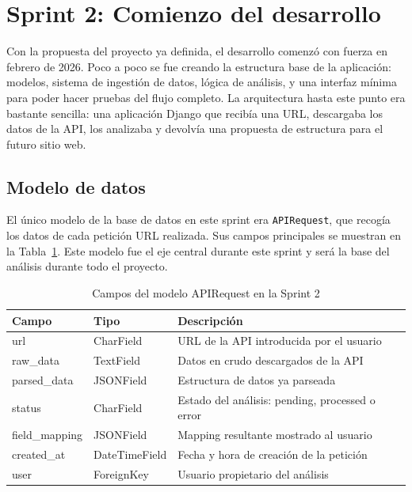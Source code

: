 \section{Sprint 2: Comienzo del desarrollo}
\label{sec:comienzo-desarrollo}

Con la propuesta del proyecto ya definida, el desarrollo comenzó con fuerza en febrero de 2026. Poco a poco se fue creando la estructura base de 
la aplicación: modelos, sistema de ingestión de datos, lógica de análisis, y una interfaz mínima para poder hacer
pruebas del flujo completo. La arquitectura hasta este punto era bastante sencilla: una aplicación Django que recibía una URL, descargaba los 
datos de la API, los analizaba y devolvía una propuesta de estructura para el futuro sitio web.

\subsection{Modelo de datos}
\label{subsec:modelo-datos}

El único modelo de la base de datos en este sprint era \texttt{APIRequest}, que recogía 
los datos de cada petición URL realizada. Sus campos principales se muestran en la 
Tabla~\ref{tab:modelo-apirequest}. Este modelo fue el eje central durante este sprint 
y será la base del análisis durante todo el proyecto.

\begin{table}[H]
    \centering
    \begin{tabular}{|l|l|p{8cm}|}
        \hline
        \textbf{Campo} & \textbf{Tipo} & \textbf{Descripción} \\
        \hline
        url & CharField & URL de la API introducida por el usuario \\
        \hline
        raw\_data & TextField & Datos en crudo descargados de la API \\
        \hline
        parsed\_data & JSONField & Estructura de datos ya parseada \\
        \hline
        status & CharField & Estado del análisis: pending, processed o error \\
        \hline
        field\_mapping & JSONField & Mapping resultante mostrado al usuario \\
        \hline
        created\_at & DateTimeField & Fecha y hora de creación de la petición \\
        \hline
        user & ForeignKey & Usuario propietario del análisis \\
        \hline
    \end{tabular}
    \caption{Campos del modelo APIRequest en la Sprint 2}
    \label{tab:modelo-apirequest}
\end{table}



